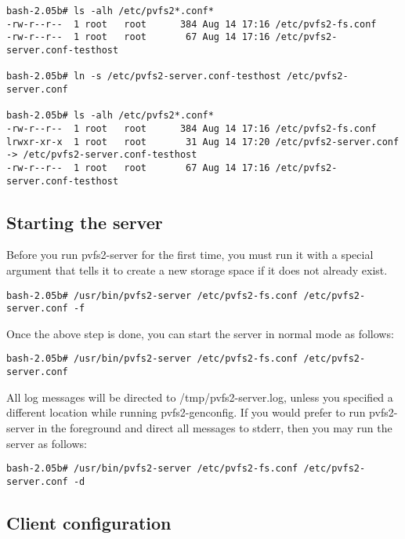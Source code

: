 \documentclass[11pt, letterpaper]{article}
\begin{document}
\begin{verbatim}
bash-2.05b# ls -alh /etc/pvfs2*.conf*
-rw-r--r--  1 root   root      384 Aug 14 17:16 /etc/pvfs2-fs.conf
-rw-r--r--  1 root   root       67 Aug 14 17:16 /etc/pvfs2-server.conf-testhost

bash-2.05b# ln -s /etc/pvfs2-server.conf-testhost /etc/pvfs2-server.conf

bash-2.05b# ls -alh /etc/pvfs2*.conf*
-rw-r--r--  1 root   root      384 Aug 14 17:16 /etc/pvfs2-fs.conf
lrwxr-xr-x  1 root   root       31 Aug 14 17:20 /etc/pvfs2-server.conf -> /etc/pvfs2-server.conf-testhost
-rw-r--r--  1 root   root       67 Aug 14 17:16 /etc/pvfs2-server.conf-testhost

\end{verbatim}

\subsection{Starting the server}

Before you run pvfs2-server for the first time, you must run it with a special 
argument that tells it to create a new storage space if it does not already 
exist.

\begin{verbatim}
bash-2.05b# /usr/bin/pvfs2-server /etc/pvfs2-fs.conf /etc/pvfs2-server.conf -f
\end{verbatim}

Once the above step is done, you can start the server in normal mode 
as follows:

\begin{verbatim}
bash-2.05b# /usr/bin/pvfs2-server /etc/pvfs2-fs.conf /etc/pvfs2-server.conf
\end{verbatim}

All log messages will be directed to /tmp/pvfs2-server.log, unless you specified
a different location while running pvfs2-genconfig.  If you would prefer to run 
pvfs2-server in the foreground and direct all messages to stderr, then 
you may run the server as follows:

\begin{verbatim}
bash-2.05b# /usr/bin/pvfs2-server /etc/pvfs2-fs.conf /etc/pvfs2-server.conf -d
\end{verbatim}

\subsection{Client configuration}
\end{document}
